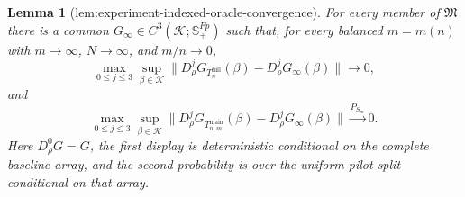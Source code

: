 \documentclass{article}
\newtheorem{lemma}{Lemma}
\begin{document}
\begin{lemma}[lem:experiment-indexed-oracle-convergence]\label{lem:experiment-indexed-oracle-convergence}
For every member of \(\mathfrak M\) there is a common \(G_{\infty}\in C^3(\mathcal K;\mathbb S_{+}^{Fp})\) such that, for every balanced \(m=m(n)\) with \(m\to\infty\), \(N\to\infty\), and \(m/n\to0\), \[\max_{0\le j\le3}\sup_{\beta\in\mathcal K}\lVert D_{\rho}^{j}G_{T_n^{\mathrm{full}}}(\beta)-D_{\rho}^{j}G_{\infty}(\beta)\rVert\to0,\] and \[\max_{0\le j\le3}\sup_{\beta\in\mathcal K}\lVert D_{\rho}^{j}G_{T_{n,m}^{\mathrm{main}}}(\beta)-D_{\rho}^{j}G_{\infty}(\beta)\rVert\xrightarrow{P_{S_m}}0.\] Here \(D_{\rho}^{0}G=G\), the first display is deterministic conditional on the complete baseline array, and the second probability is over the uniform pilot split conditional on that array.
\end{lemma}
\end{document}
